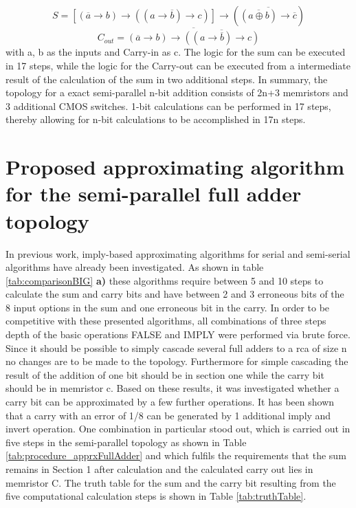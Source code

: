 \documentclass[]{IEEEtran}
\begin{document}
\begin{equation}
S = [(\overline{a} \rightarrow b) \rightarrow ((a \rightarrow \overline{b}) \rightarrow c)] \rightarrow (\overline{(\overline{a \oplus b}) \rightarrow \overline{c}})
\end{equation}
\begin{equation}
C_{out} = \overline{(\overline{a} \rightarrow b) \rightarrow \overline{((a \rightarrow \overline{b}) \rightarrow c)}}
\end{equation}
with a, b as the inputs and Carry-in as c. The logic for the sum can be executed in 17 steps, while the logic for the Carry-out can be executed from a intermediate result of the calculation of the sum in two additional steps.
\bigbreak
In summary, the topology for a exact semi-parallel n-bit addition consists of 2n+3 memristors and 3 additional CMOS switches. 1-bit calculations can be performed in 17 steps, thereby allowing for n-bit calculations to be accomplished in 17n steps.

\section{Proposed approximating algorithm for the semi-parallel full adder topology}
\label{ch:proposedAPPROX}

In previous work, \gls{imply}-based approximating algorithms for serial and semi-serial algorithms have already been investigated. As shown in table \ref{tab:comparisonBIG} \textbf{a)} these algorithms require between 5 and 10 steps to calculate the sum and carry bits and have between 2 and 3 erroneous bits of the 8 input options in the sum and one erroneous bit in the carry.
In order to be competitive with these presented algorithms, all combinations of three steps depth of the basic operations FALSE and IMPLY were performed via brute force. Since it should be possible to simply cascade several full adders to a \gls{rca} of size n no changes are to be made to the topology. Furthermore for simple cascading the result of the addition of one bit should be in section one while the carry bit should be in memristor c. Based on these results, it was investigated whether a carry bit can be approximated by a few further operations. It has been shown that a carry with an error of 1/8 can be generated by 1 additional imply and invert operation. One combination in particular stood out, which is carried out in five steps in the semi-parallel topology as shown in Table \ref{tab:procedure_apprxFullAdder} and which fulfils the requirements that the sum remains in Section 1 after calculation and the calculated carry out lies in memristor C. The truth table for the sum and the carry bit resulting from the five computational calculation steps is shown in Table \ref{tab:truthTable}.
\end{document}

